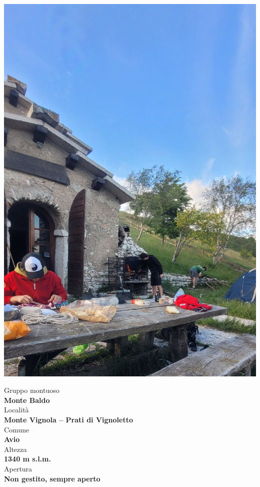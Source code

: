 \documentclass{article}
\begin{document}
\noindent
\begin{minipage}[t]{0.45\textwidth}
  \vspace{0pt} %
  \includegraphics[width=\linewidth]{images/bivacco.jpg}
\end{minipage}%
\hfill
\begin{minipage}[t]{0.5\textwidth}
  \vspace{0pt} %
  
  Gruppo montuoso\\
  \textbf{\large Monte Baldo}
  \\[1em] %
  Località\\
  \textbf{\large Monte Vignola – Prati di Vignoletto}
  \\[1em] %
  Comune\\  
  \textbf{\large Avio}
  \\[1em] %
  Altezza\\  
  \textbf{\large 1340 m s.l.m.}
  \\[1em] %
  Apertura\\  
  \textbf{\large Non gestito, sempre aperto}

\end{minipage}
\end{document}
